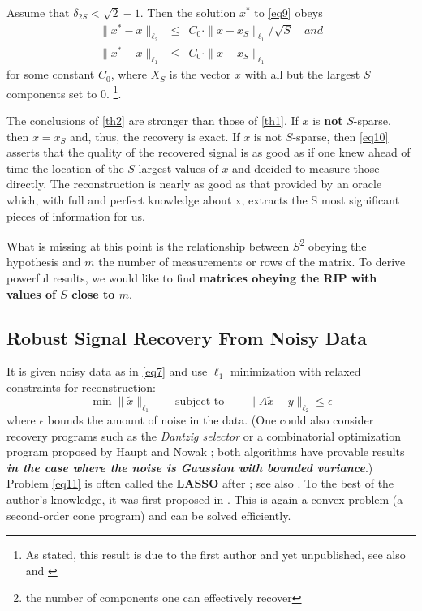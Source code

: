\begin{theorem}\cite{16}
	\label{th2}
	Assume that $\delta_{2S}<\sqrt{2}-1$. Then the solution $x^*$ to \cref{eq9} obeys
	\begin{eqnarray}
	\label{eq10}
	\|x^*-x\|_{\ell_2} &\leq& C_0 \cdot \|x-x_S\|_{\ell_1}/\sqrt{S} \quad and \nonumber\\
	\|x^*-x\|_{\ell_1} &\leq& C_0 \cdot \|x-x_S\|_{\ell_1}
	\end{eqnarray}
	for some constant $C_0$, where $X_S$ is the vector $x$ with all but the largest $S$ components set to 0. \footnote{As stated, this result is due to the first author\cite{17} and yet unpublished, see also \cite{16} and \cite{18}}.
\end{theorem}

The conclusions of \cref{th2} are stronger than those of \cref{th1}. \textcolor[rgb]{1,0,0}{If $x$ is \textbf{not} $S$-sparse, then $x=x_S$ and, thus, the recovery is exact.} If $x$ is not $S$-sparse, then \cref{eq10} asserts that the quality of the recovered signal is as good as if one knew ahead of time the location of the $S$ largest values of $x$ and decided to measure those directly. The reconstruction is nearly as good as that provided by an oracle which, with full and perfect knowledge about x, extracts the S most significant pieces of information for us.
 
What is missing at this point is the relationship between $S$\footnote{the number of components one can effectively recover} obeying the hypothesis and $m$ the number of measurements or rows of the matrix. To derive powerful results, we would like to find \textcolor[rgb]{1,0,0}{\textbf{matrices obeying the RIP with values of $S$ close to $m$}}. 
 
\subsection{Robust Signal Recovery From Noisy Data}
It is given noisy data as in \cref{eq7} and use $\ell_1$ minimization with relaxed constraints for reconstruction:
\begin{equation}
\label{eq11}
\min\|\tilde{x}\|_{\ell_1} \qquad \mbox{subject to} \qquad \|A\tilde{x}-y\|_{\ell_2} \leq \epsilon
\end{equation}
where $\epsilon$ bounds the amount of noise in the data. (One could also consider recovery programs such as the \emph{Dantzig selector} \cite{19} or a combinatorial optimization program proposed by Haupt and Nowak \cite{20}; both algorithms have provable results \textbf{\emph{in the case where the noise is Gaussian with bounded variance}}.) Problem \cref{eq11} is often called the \textcolor[rgb]{1,0,0}{\textbf{LASSO}} after \cite{21}; see also \cite{22}. To the best of the author's knowledge, it was first proposed in \cite{Santosa1986}. This is again a convex problem (a second-order cone program) and can be solved efficiently.

